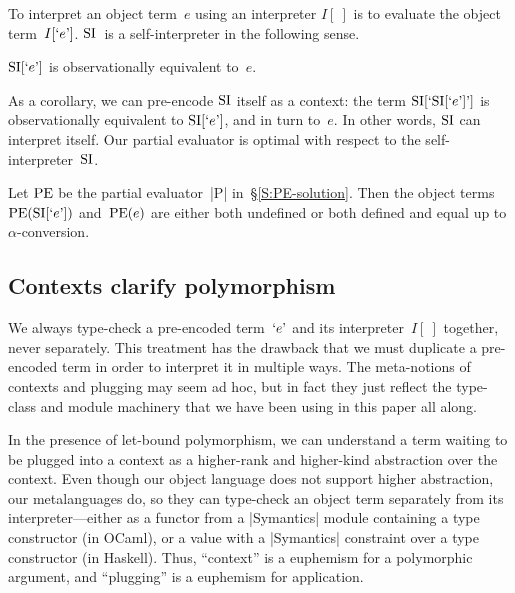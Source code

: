 To interpret an object term~$e$ using an interpreter $I[~]$ is to
evaluate the object term~$I[\encode{e}]$.  $\si$~is
a self\hyp interpreter in the following sense.
\begin{proposition}
    $\si[\encode{e}]$ is observationally equivalent to~$e$.
\end{proposition}
As a corollary, we can pre-encode $\si$ itself as
a context: the term $\si[\encode{\si[\encode{e}]}]$ is observationally
equivalent to $\si[\encode{e}]$, and in turn to~$e$.  In other words,
$\si$ can interpret itself.  Our partial evaluator is optimal with respect to
the self\hyp interpreter~$\si$.
\begin{proposition}
    Let $\pe$ be the partial evaluator~|P| in~\S\ref{S:PE-solution}.
    Then the object terms $\pe(\si[\encode{e}])$ and~$\pe(e)$ are
    either both undefined or both defined and
    equal up to $\alpha$\hyp conversion.
\end{proposition}

\subsection{Contexts clarify polymorphism}
\label{S:clarify}

We always type-check a pre-encoded term~$\encode{e}$ and its interpreter~$I[~]$
together, never separately.  This treatment has the drawback that
we must duplicate a pre-encoded term in order to interpret it in
multiple ways.  The meta-notions of contexts and plugging may seem ad
hoc, but in fact they just reflect the type-class and module
machinery that we have been using in this paper all along.

In the presence of let-bound polymorphism, we can understand a term
waiting to be plugged into a context as a higher-rank and higher-kind
abstraction over the context.  Even though our object language does not support
higher abstraction, our metalanguages do, so they can type-check an object term
separately from its interpreter---either as a functor from a |Symantics| module
containing a type constructor
(in OCaml), or a value with a |Symantics| constraint over a type
constructor (in Haskell).  Thus,
``context'' is a euphemism for a polymorphic argument, and ``plugging''
is a euphemism for application.

